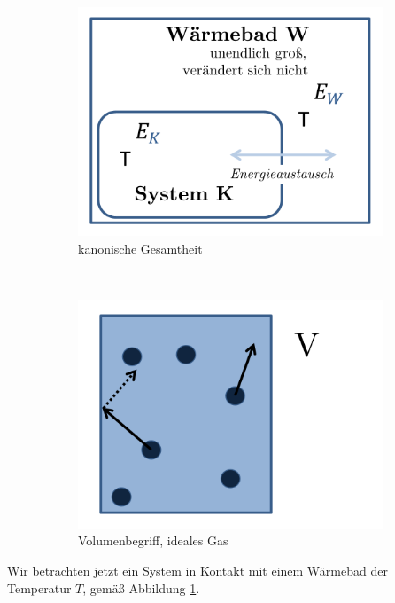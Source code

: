 \documentclass[12pt]{article}
\begin{document}
\begin{figure}[h]
		\begin{subfigure}[h]{0.5 \textwidth}
		\centering
		\includegraphics[width=\textwidth]{Folie5.png}
		\caption{kanonische Gesamtheit} 
		\label{fig:Waermebad}
		\centering
	\end{subfigure}
	~
	\begin{subfigure}[h]{0.5\textwidth}
		\centering
		\includegraphics[width=\textwidth]{Folie6.png}
		\caption{Volumenbegriff, ideales Gas} 
		\label{fig:Volumen}
		\centering
	\end{subfigure}
	\caption{ }
\end{figure}

Wir betrachten jetzt ein System in Kontakt mit einem Wärmebad der Temperatur $T$, gemäß Abbildung \ref{fig:Waermebad}. \\
\end{document}
